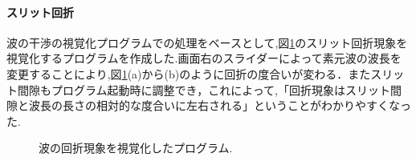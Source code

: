 \documentclass[a4j,twocolumn,uplatex]{jarticle}
\begin{document}
\vspace{-5mm}
\paragraph{スリット回折}
波の干渉の視覚化プログラムでの処理をベースとして,図\ref{fig:program2}のスリット回折現象を視覚化するプログラムを作成した.画面右のスライダーによって素元波の波長を変更することにより,図\ref{fig:program2}(a)から(b)のように回折の度合いが変わる．またスリット間隙もプログラム起動時に調整でき，これによって,「回折現象はスリット間隙と波長の長さの相対的な度合いに左右される」ということがわかりやすくなった.
\begin{figure}[H]
\caption{{\footnotesize 波の回折現象を視覚化したプログラム.}}
\label{fig:program2}
\end{figure}
\end{document}
